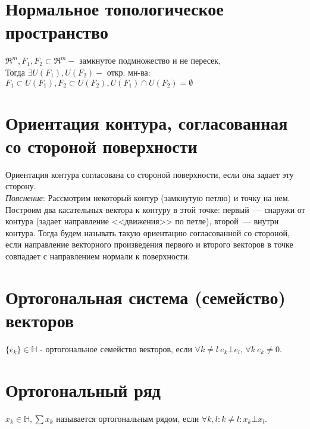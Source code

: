 \documentclass[paper=a4, fontsize=14pt]{article}
\begin{document}
\section{Нормальное топологическое пространство}
$\Re^m, F_1,F_2 \subset \Re^m -$ замкнутое подмножество и не пересек, \\
Тогда  $\exists U(F_1), U(F_2) -$ откр. мн-ва: $F_1 \subset U(F_1), F_2 \subset U(F_2), U(F_1) \cap U(F_2) = \emptyset$

\section{Ориентация контура, согласованная со стороной поверхности}

Ориентация контура согласована со стороной поверхности, если она задает эту сторону.\\

\emph{Пояснение}:
Рассмотрим некоторый контур (замкнутую петлю) и точку на нем. Построим два касательных вектора к контуру в этой точке: первый~--- снаружи от контура (задает направление <<движения>> по петле), второй~--- внутри контура. Тогда будем называть такую ориентацию согласованной со стороной, если направление векторного произведения первого и второго векторов в точке совпадает с направлением нормали к поверхности.

\begin{center}
\end{center}

\section{Ортогональная система (семейство) векторов}
$\{e_k\} \in \mathds{H}$ - ортогональное семейство векторов, если $\forall k \neq l ~ e_k \bot e_l$, $\forall k\ e_k \neq 0$.

\section{Ортогональный ряд}
$x_k \in \mathds{H}, \sum x_k$ называется ортогональным рядом, если $\forall k, l: k \neq l: x_k \bot x_l$.
\end{document}
